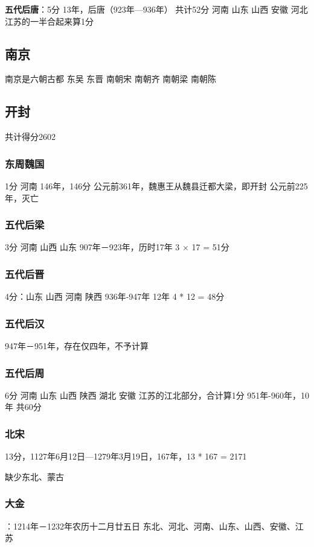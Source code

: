 \textbf{五代后唐}：5分
13年，后唐（923年—936年）
共计52分
河南 山东 山西 安徽 
河北 江苏的一半合起来算1分


\subsection{南京}
南京是六朝古都
东吴
东晋
南朝宋
南朝齐
南朝梁
南朝陈

\subsection{开封}
共计得分2602

\subsubsection{东周魏国}
1分 河南
146年，146分
公元前361年，魏惠王从魏县迁都大梁，即开封
公元前225年，灭亡

\subsubsection{五代后梁}
3分 河南 山西 山东
907年－923年，历时17年
3 × 17 = 51分

\subsubsection{五代后晋}
4分：山东 山西 河南 陕西
936年-947年  12年
4 * 12 = 48分

\subsubsection{五代后汉}
947年－951年，存在仅四年，不予计算

\subsubsection{五代后周}
6分
河南 山东 山西 陕西 湖北
安徽 江苏的江北部分，合计算1分
951年-960年，10年
共60分

\subsubsection{北宋}
13分，1127年6月12日—1279年3月19日，167年，13 * 167 = 2171

缺少东北、蒙古

\subsubsection{大金}：1214年－1232年农历十二月廿五日
东北、河北、河南、山东、山西、安徽、江苏

